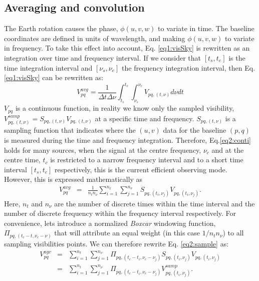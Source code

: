\documentclass[useAMS,usenatbib]{mn2e}
\begin{document}
\subsection{Averaging and convolution}
\label{sec:AvgCon}
The Earth rotation causes the phase, $\phi (u,v,w)$ to variate in time. The baseline 
coordinates are defined in units of wavelength, and making $\phi (u,v,w)$ to variate in frequency. 
To take this effect into account, Eq. \ref{eq1:visSky} is  rewritten as an integration over time and frequency interval. If we 
consider that $[t_s,t_e]$ is the time integration interval and $[\nu_s,\nu_e]$ the frequency integration 
interval, then Eq.\ref{eq1:visSky} can be rewritten as:
\begin{equation}
V_{pq}^{avg}=\frac{1}{\Delta t \Delta \nu} \int_{t_s}^{t_e}\int_{\nu_s}^{\nu_e}V_{pq,(t,\nu)}d\nu dt
\label{eq2:conti}
\end{equation}
 $V_{pq}$ is a continuous function, in reality we know only the sampled visibility, 
$V_{pq,(t,\nu)}^{samp}=S_{pq,(t,\nu)}V_{pq,(t,\nu)}$ at a specific time and frequency. $S_{pq,(t,\nu)}$ is a sampling 
function that indicates where the $(u, v)$ data for the baseline $(p,q)$ is measured  during the time and frequency integration. 
Therefore, 
Eq.\ref{eq2:conti} holds for many sources, when the signal at the centre frequency, $\nu_c$ and at the centre time, 
$t_c$ is restricted to a narrow frequency interval and to a short time interval $[t_s,t_e]$ 
respectively, this is the current efficient observing mode. However, this is expressed mathematically as 
\begin{eqnarray}
V_{pq}^{avg}&=&\frac{1}{n_t n_{\nu}}  \sum_{i=1}^{n_t}\sum_{j=1}^{n_{\nu}} S_{pq,(t_i, 
\nu_j)}V_{pq,(t_i,\nu_j)}.\label{eq2:sample}
\end{eqnarray}
Here, $n_t$ and $n_{\nu}$ are the number of discrete times within the time interval  and the number of discrete frequency 
within the frequency interval  respectively. For convenience, lets introduce a normalized \textit{Boxcar} windowing 
function, $\Pi_{pq,(t_c - t,\nu_c -\nu)}$  that will attribute an equal weight (in this case $1/n_t n_{\nu}$) to all sampling visibilities 
points. We can therefore rewrite Eq. \ref{eq2:sample} as:
\begin{eqnarray}
V_{pq}^{agv}&=& \sum_{i=1}^{n_t}\sum_{j=1}^{n_{\nu}}\Pi_{pq,(t_c - t_i,\nu_c -\nu_j)}S_{pq,(t_i,\nu_j)}V_{pq,(t_i,\nu_j)}\\
	    &=& \sum_{i=1}^{n_t}\sum_{j=1}^{n_{\nu}}\Pi_{pq,(t_c - t_i,\nu_c -\nu_j)}V_{pq,(t_i,\nu_j)}^{samp}. 
\label{eq:avscon}
\end{eqnarray}
\end{document}
